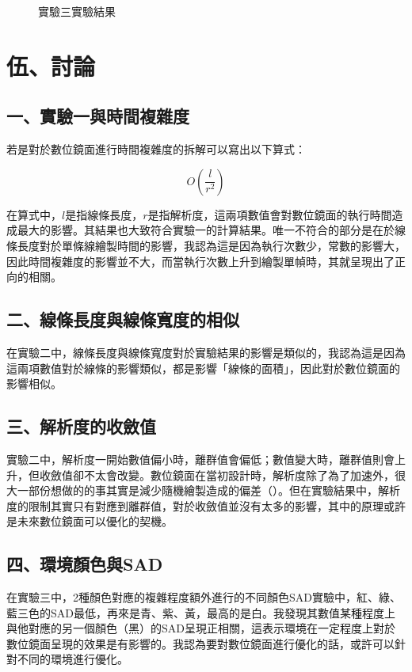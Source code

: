 \documentclass[12pt]{article}
\begin{document}
\begin{figure}[htbp]
  \caption{實驗三實驗結果}\label{fig:result_5}

\end{figure}

\newpage
\section{伍、討論}

\subsection{一、實驗一與時間複雜度}

若是對於數位鏡面進行時間複雜度的拆解可以寫出以下算式：

\[
O(\frac{l}{r^2}) 
\]

在算式中，$l$是指線條長度，$r$是指解析度，這兩項數值會對數位鏡面的執行時間造成最大的影響。其結果也大致符合實驗一的計算結果。唯一不符合的部分是在於線條長度對於單條線繪製時間的影響，我認為這是因為執行次數少，常數的影響大，因此時間複雜度的影響並不大，而當執行次數上升到繪製單幀時，其就呈現出了正向的相關。

\subsection{二、線條長度與線條寬度的相似}

在實驗二中，線條長度與線條寬度對於實驗結果的影響是類似的，我認為這是因為這兩項數值對於線條的影響類似，都是影響「線條的面積」，因此對於數位鏡面的影響相似。

\subsection{三、解析度的收斂值}

實驗二中，解析度一開始數值偏小時，離群值會偏低；數值變大時，離群值則會上升，但收斂值卻不太會改變。數位鏡面在當初設計時，解析度除了為了加速外，很大一部份想做的的事其實是減少隨機繪製造成的偏差（\cite{github_mirror}）。但在實驗結果中，解析度的限制其實只有對應到離群值，對於收斂值並沒有太多的影響，其中的原理或許是未來數位鏡面可以優化的契機。

\subsection{四、環境顏色與SAD}

在實驗三中，2種顏色對應的複雜程度額外進行的不同顏色SAD實驗中，紅、綠、藍三色的SAD最低，再來是青、紫、黃，最高的是白。我發現其數值某種程度上與他對應的另一個顏色（黑）的SAD呈現正相關，這表示環境在一定程度上對於數位鏡面呈現的效果是有影響的。我認為要對數位鏡面進行優化的話，或許可以針對不同的環境進行優化。
\end{document}
